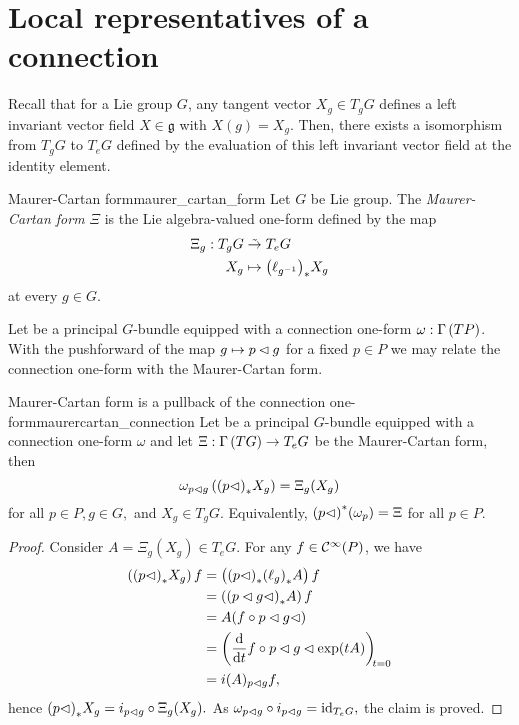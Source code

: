 \section{Local representatives of a connection}
Recall that for a Lie group \(G\), any tangent vector \(X_g \in T_gG\) defines a left invariant vector field \(X \in \mathfrak{g}\) with \(X(g) = X_g\). Then, there exists a isomorphism from \(T_gG\) to \(T_eG\) defined by the evaluation of this left invariant vector field at the identity element.
\begin{definition}{Maurer-Cartan form}{maurer_cartan_form}
    Let \(G\) be Lie group. The \emph{Maurer-Cartan form \(\Xi\)} is the Lie algebra-valued one-form defined by the map
    \begin{align*}
        \Xi_g : T_gG &\mathrel{\tilde{\to}} T_eG\\
                 X_g &\mapsto {\left(\ell_{g^{-1}}\right)}_{\ast{}}X_g
    \end{align*}
    at every \(g \in G\).
\end{definition}

Let  be a principal \(G\)-bundle equipped with a connection one-form \(\omega : \Gamma\left(TP\right)\). With the pushforward of the map \(g \mapsto p\mathbin{\vartriangleleft} g\) for a fixed \(p \in P\) we may relate the connection one-form with the Maurer-Cartan form.
\begin{lemma}{Maurer-Cartan form is a pullback of the connection one-form}{maurercartan_connection}
    Let  be a principal \(G\)-bundle equipped with a connection one-form \(\omega\) and let \(\Xi : \Gamma\left(TG\right) \to T_eG\) be the Maurer-Cartan form, then
    \begin{equation*}
        \omega_{p\mathbin{\vartriangleleft} g}\left({(p\mathbin{\vartriangleleft})}_{\ast{}}{X_g}\right) = \Xi_g(X_g)
    \end{equation*}
    for all \(p \in P, g\in G,\) and \(X_g \in T_gG\). Equivalently, \({(p\mathbin{\vartriangleleft})}^{\ast}_{}{(\omega_p)} = \Xi\) for all \(p \in P\).
\end{lemma}
\begin{proof}
    Consider \(A = \Xi_g(X_g) \in T_eG.\) For any \(f \in \mathcal{C}^\infty(P)\), we have
    \begin{align*}
        \left(\pf{(p\ract)}{X_g}\right)f &= \left(\pf{(p \ract)}{\pf{(\ell_g)}{A}}\right)f\\
                                                    &= \left(\pf{(p \ract g \ract)}{A}\right)f\\
                                                    &= A(f \circ p \ract g \ract)\\
                                                    &= \diff*{f \circ p \ract g \ract \exp(tA)}{t}[t=0]\\
                                                    &= i(A)_{p \ract g} f,
    \end{align*}
    hence \({(p\mathbin{\vartriangleleft})}_{\ast{}}{X_g} = i_{p \mathbin{\vartriangleleft} g} \circ \Xi_g(X_g).\) As \(\omega_{p \mathbin{\vartriangleleft} g} \circ i_{p \mathbin{\vartriangleleft} g} = \operatorname{id}_{T_eG},\) the claim is proved.
\end{proof}


